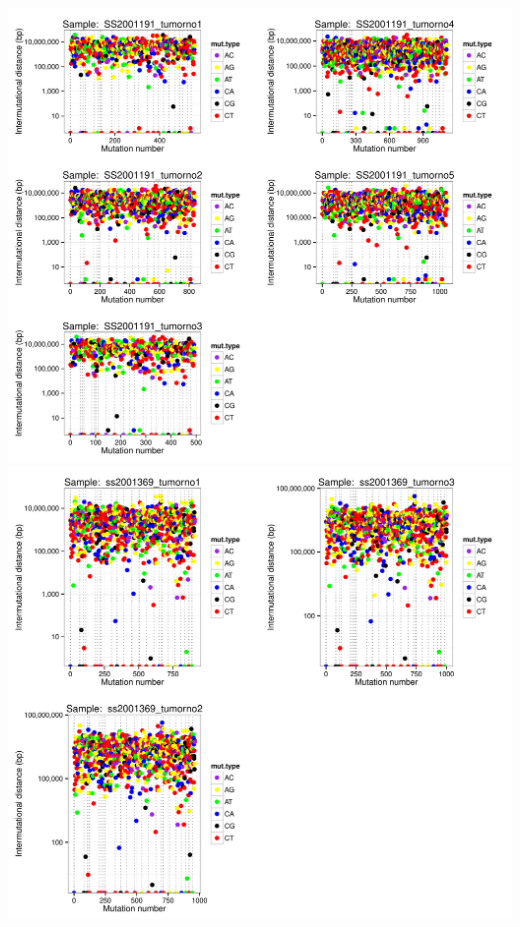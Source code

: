 \documentclass[a4paper,11pt]{article}
\begin{document}
\includegraphics{CLLpilot_rainfallplots_pub-008}
\\
\includegraphics{CLLpilot_rainfallplots_pub-009}
\\
\end{document}
